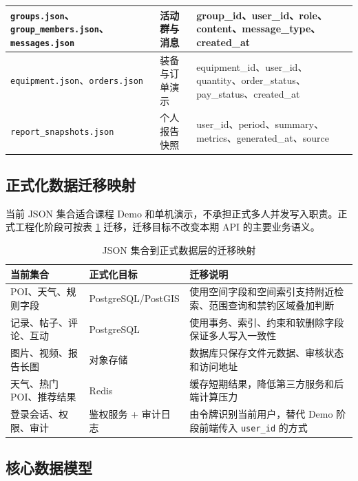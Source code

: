 {\begin{longtable}{|>{\raggedright\arraybackslash}p{3.8cm}|>{\raggedright\arraybackslash}p{3.0cm}|>{\raggedright\arraybackslash}p{6.8cm}|}
  \hline
  \texttt{groups.json}、\texttt{group\_members.json}、\texttt{messages.json} & 活动群与消息 & group\_id、user\_id、role、content、message\_type、created\_at \\
  \hline
  \texttt{equipment.json}、\texttt{orders.json} & 装备与订单演示 & equipment\_id、user\_id、quantity、order\_status、pay\_status、created\_at \\
  \hline
  \texttt{report\_snapshots.json} & 个人报告快照 & user\_id、period、summary、metrics、generated\_at、source \\
\end{longtable}
}

\subsection{正式化数据迁移映射}

当前 JSON 集合适合课程 Demo 和单机演示，不承担正式多人并发写入职责。正式工程化阶段可按表 \ref{tab:data-migration-map} 迁移，迁移目标不改变本期 API 的主要业务语义。

\begin{table}[H]
  \centering
  \caption{JSON 集合到正式数据层的迁移映射}
  \label{tab:data-migration-map}
  \begin{tabularx}{\textwidth}{p{3.2cm}|p{4cm}|X}
    \toprule
    \textbf{当前集合} & \textbf{正式化目标} & \textbf{迁移说明} \\
    \midrule
    POI、天气、规则字段 & PostgreSQL/PostGIS & 使用空间字段和空间索引支持附近检索、范围查询和禁钓区域叠加判断 \\
    \hline
    记录、帖子、评论、互动 & PostgreSQL & 使用事务、索引、约束和软删除字段保证多人写入一致性 \\
    \hline
    图片、视频、报告长图 & 对象存储 & 数据库只保存文件元数据、审核状态和访问地址 \\
    \hline
    天气、热门 POI、推荐结果 & Redis & 缓存短期结果，降低第三方服务和后端计算压力 \\
    \hline
    登录会话、权限、审计 & 鉴权服务 + 审计日志 & 由令牌识别当前用户，替代 Demo 阶段前端传入 \texttt{user\_id} 的方式 \\
    \bottomrule
  \end{tabularx}
\end{table}

\subsection{核心数据模型}

